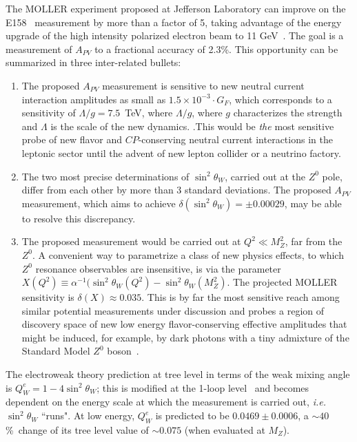 The MOLLER experiment proposed at Jefferson Laboratory can improve on the E158~\cite{ref:cl:Anthony:2005pm}
measurement by more than a factor of 5, taking advantage of the energy upgrade of the high intensity
polarized electron beam to 11 GeV~\cite{ref:cl:Dudek:2012vr}. The goal is a measurement of $A_{PV}$ to a fractional accuracy
of 2.3\%. 
This opportunity can be summarized in three inter-related bullets:
\begin{enumerate}
\item The proposed $A_{PV}$ measurement is sensitive to new neutral current interaction amplitudes as 
small as $1.5\times 10^{-3}\cdot G_F$, which corresponds to a sensitivity of $\Lambda/g =  7.5$~TeV, where $\Lambda/g$, where $g$ characterizes the strength and $\Lambda$ is the
scale of the new dynamics. .This would be {\it the} most sensitive probe of new flavor and $C\!P$-conserving 
neutral current interactions in the leptonic sector until the advent of new lepton collider or a neutrino factory. 
\item  The two most precise determinations of 
$\sin^2\theta_W$, carried out at the $Z^0$ pole, differ from each other by more than 3 standard deviations. 
The proposed $A_{PV}$ measurement, which aims to achieve
$\delta(\sin^2\theta_W) = \pm 0.00029$, may be able to resolve this discrepancy.
\item The proposed measurement would be carried out at $Q^2\ll M_Z^2$, far from the $Z^0$. A 
convenient way to parametrize a class of new physics effects, to which $Z^0$ resonance observables are 
insensitive, is via the parameter 
$X(Q^2)\equiv\alpha^{-1}(\sin^2\theta_W(Q^2)-\sin^2\theta_W(M_Z^2)$. The projected MOLLER sensitivity is 
$\delta(X)\approx 0.035$. This is by far the most sensitive reach among similar potential
measurements under discussion and probes a region of discovery space of new low
energy flavor-conserving effective amplitudes that might be induced, for example, by dark photons with 
a tiny admixture of the Standard Model $Z^0$ boson~\cite{ref:cl:darkz}. 
\end{enumerate}

The electroweak theory prediction at tree level in terms of the weak mixing angle is $Q^e_W = 1 - 4\sin^2\theta_W$; 
this is modified at the 1-loop level~\cite{ref:cl:Czarnecki:1995fw, ref:cl:Czarnecki:2000ic, ref:cl:Erler:2004in} and
becomes dependent on the energy scale at which the measurement is carried out, {\em i.e.} $\sin^2\theta_W$
``runs". At low energy, $Q^e_W$  is predicted to be 
$0.0469\pm 0.0006$, a $\sim 40$\%\ change of its tree level value of $\sim 0.075$ (when evaluated at $M_Z$).

